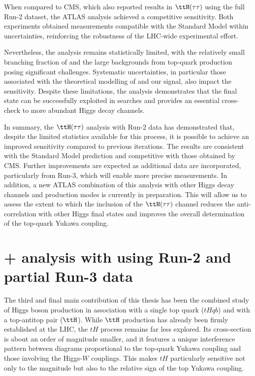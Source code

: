When compared to CMS, which also reported results in \(\ttH(\tau\tau)\) using the full Run-2 dataset, the ATLAS analysis achieved a competitive sensitivity. Both experiments obtained measurements compatible with the Standard Model within uncertainties, reinforcing the robustness of the LHC-wide experimental effort.

Nevertheless, the analysis remains statistically limited, with the relatively small branching fraction of \htautau and the large backgrounds from top-quark production posing significant challenges. Systematic uncertainties, in particular those associated with the theoretical modelling of \ttbar and our signal, also impact the sensitivity. Despite these limitations, the analysis demonstrates that the \tauhadhad final state can be successfully exploited in \ttH searches and provides an essential cross-check to more abundant Higgs decay channels.

In summary, the \(\ttH(\tau\tau)\) analysis with Run-2 data has demonstrated that, despite the limited statistics available for this process, it is possible to achieve an improved sensitivity compared to previous iterations. The results are consistent with the Standard Model prediction and competitive with those obtained by CMS. Further improvements are expected as additional data are incorporated, particularly from Run-3, which will enable more precise measurements. In addition, a new ATLAS combination of this analysis with other Higgs decay channels and production modes is currently in preparation. This will allow us to assess the extent to which the inclusion of the \(\ttH(\tau\tau)\) channel reduces the anti-correlation with other Higgs final states and improves the overall determination of the top-quark Yukawa coupling.  

\section{\thqb + \ttH analysis with \htautau using Run-2 and partial Run-3 data}

The third and final main contribution of this thesis has been the combined study of Higgs boson production in association with a single top quark (\(tHqb\)) and with a top-antitop pair (\(\ttH\)). While \(\ttH\) production has already been firmly established at the LHC, the \(tH\) process remains far less explored. Its cross-section is about an order of magnitude smaller, and it features a unique interference pattern between diagrams proportional to the top-quark Yukawa coupling and those involving the Higgs-$W$ couplings. This makes \(tH\) particularly sensitive not only to the magnitude but also to the relative sign of the top Yukawa coupling.  

